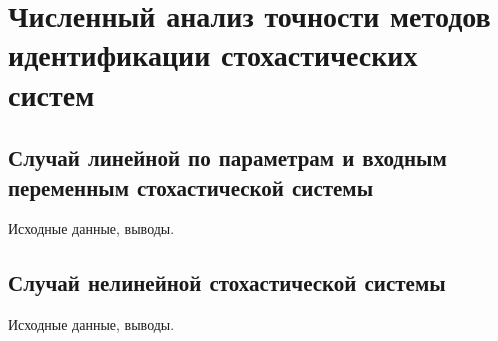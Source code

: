\chapter[Численный анализ точности методов идентификации \\ стохастических систем]{%
  Численный анализ точности методов идентификации стохастических систем
}

\section{Случай линейной по параметрам и входным переменным стохастической системы}

Исходные данные, выводы.

\section{Случай нелинейной стохастической системы}

Исходные данные, выводы.